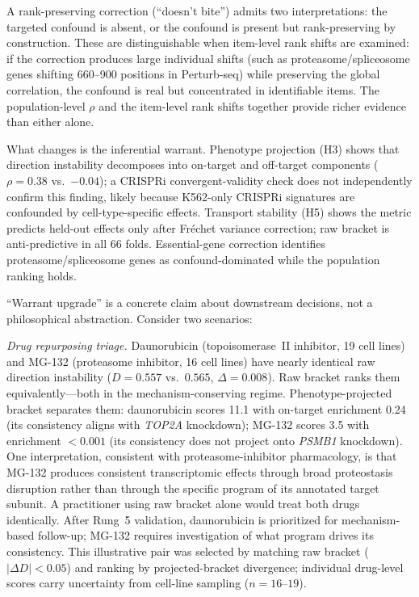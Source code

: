 \documentclass[11pt]{article}
\begin{document}
A rank-preserving correction (``doesn't bite'') admits two
interpretations: the targeted confound is absent, or the confound is
present but rank-preserving by construction. These are distinguishable
when item-level rank shifts are examined: if the correction produces
large individual shifts (such as proteasome/spliceosome genes shifting
660--900 positions in Perturb-seq) while preserving the global
correlation, the confound is real but concentrated in identifiable items.
The population-level $\rho$ and the item-level rank shifts together
provide richer evidence than either alone.

What changes is the inferential warrant. Phenotype projection (H3) shows
that direction instability decomposes into on-target and off-target
components ($\rho = 0.38$ vs.\ $-0.04$); a CRISPRi convergent-validity
check does not independently confirm this finding, likely because
K562-only CRISPRi signatures are confounded by cell-type-specific
effects. Transport stability (H5) shows
the metric predicts held-out effects only after Fr\'{e}chet variance
correction; raw bracket is anti-predictive in all 66 folds. Essential-gene
correction identifies proteasome/spliceosome genes as confound-dominated
while the population ranking holds.

``Warrant upgrade'' is a concrete claim about downstream decisions, not
a philosophical abstraction. Consider two scenarios:

\emph{Drug repurposing triage.} Daunorubicin (topoisomerase~II inhibitor,
19 cell lines) and MG-132 (proteasome inhibitor, 16 cell lines) have
nearly identical raw direction instability ($D = 0.557$ vs.\ $0.565$,
$\Delta = 0.008$). Raw bracket ranks them equivalently---both in the
mechanism-conserving regime. Phenotype-projected bracket separates them:
daunorubicin scores 11.1 with on-target enrichment 0.24 (its consistency
aligns with \emph{TOP2A} knockdown); MG-132 scores 3.5 with enrichment
$< 0.001$ (its consistency does not project onto \emph{PSMB1} knockdown).
One interpretation, consistent with proteasome-inhibitor pharmacology, is
that MG-132 produces consistent transcriptomic effects through broad
proteostasis disruption rather than through the specific program of its
annotated target subunit. A practitioner using raw bracket alone would
treat both drugs identically. After Rung~5 validation, daunorubicin is
prioritized for mechanism-based follow-up; MG-132 requires investigation
of what program drives its consistency. This illustrative pair was selected
by matching raw bracket ($|\Delta D| < 0.05$) and ranking by projected-bracket
divergence; individual drug-level scores carry uncertainty from cell-line
sampling ($n = 16$--$19$).
\end{document}
